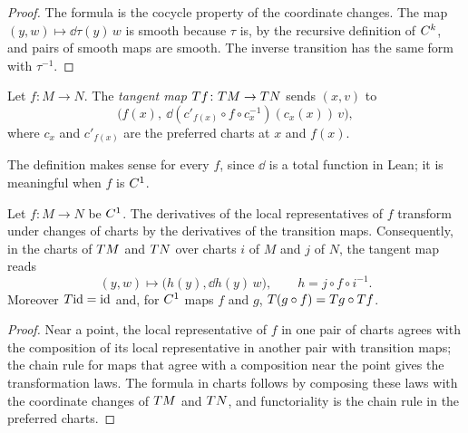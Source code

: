 \begin{proof}
  \leanok
  The formula is the cocycle property of the coordinate changes. The map $(y, w) \mapsto
  \dd\tau(y)\,w$ is smooth because $\tau$ is, by the recursive definition of $C^{k}$, and pairs of
  smooth maps are smooth. The inverse transition has the same form with $\tau^{-1}$.
\end{proof}

\begin{definition}
  \label{def:tangent-map}
  \leanok
  Let $f \colon M \to N$. The \emph{tangent map} $T f \colon T M \to T N$ sends $(x, v)$ to
  \[
    \bigl(f(x),\ \dd(c'_{f(x)} \circ f \circ c_x^{-1})(c_x(x))\,v\bigr),
  \]
  where $c_x$ and $c'_{f(x)}$ are the preferred charts at $x$ and $f(x)$.
\end{definition}

The definition makes sense for every $f$, since $\dd$ is a total function in Lean; it is
meaningful when $f$ is $C^{1}$.

\begin{theorem}
  \label{thm:man-tangent-map}
  \leanok
  Let $f \colon M \to N$ be $C^{1}$. The derivatives of the local representatives of $f$
  transform under changes of charts by the derivatives of the transition maps. Consequently, in
  the charts of $T M$ and $T N$ over charts $i$ of $M$ and $j$ of $N$, the tangent map reads
  \[
    (y, w) \longmapsto \bigl(h(y), \dd h(y)\,w\bigr), \qquad h = j \circ f \circ i^{-1}.
  \]
  Moreover $T\mathrm{id} = \mathrm{id}$ and, for $C^{1}$ maps $f$ and $g$, $T(g \circ f) = T g \circ T f$.
\end{theorem}

\begin{proof}
  \leanok
  Near a point, the local representative of $f$ in one pair of charts agrees with the
  composition of its local representative in another pair with transition maps; the chain rule for maps that agree with a composition near the point gives
  the transformation laws. The formula in charts follows by composing these laws with the
  coordinate changes of $T M$ and $T N$, and functoriality is the chain rule in the preferred
  charts.
\end{proof}

